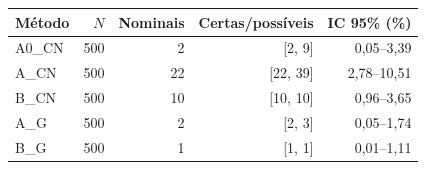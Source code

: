 \begin{tabular}{lrrrr}
\hline
Método & $N$ & Nominais & Certas/possíveis & IC 95\% (\%) \\
\hline
A0\_CN & 500 & 2 & [2, 9] & 0,05--3,39 \\
A\_CN & 500 & 22 & [22, 39] & 2,78--10,51 \\
B\_CN & 500 & 10 & [10, 10] & 0,96--3,65 \\
A\_G & 500 & 2 & [2, 3] & 0,05--1,74 \\
B\_G & 500 & 1 & [1, 1] & 0,01--1,11 \\
\hline
\end{tabular}
